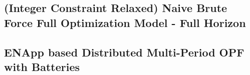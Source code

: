 \documentclass[../../outputs/main.tex]{subfiles}
\begin{document}

\subsection*{(Integer Constraint Relaxed) Naive Brute Force Full Optimization Model - Full Horizon}



\subsection{ENApp based Distributed Multi-Period OPF with Batteries}
\end{document}
